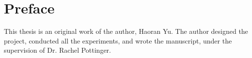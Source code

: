 
\chapter{Preface}

This thesis is an original work of the author, Haoran Yu. The author designed the project, conducted all the experiments, and wrote the manuscript, under the supervision of Dr. Rachel Pottinger.
\endinput